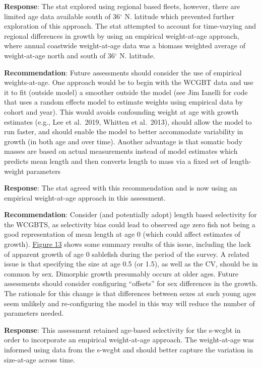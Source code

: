 \documentclass[
  english,
]{article}
\begin{document}
\textbf{Response}: The \gls{stat} explored using regional based fleets,
however, there are limited age data available south of 36\(^\circ\) N.
latitude which prevented further exploration of this approach. The
\gls{stat} attempted to account for time-varying and regional
differences in growth by using an empirical weight-at-age approach,
where annual coastwide weight-at-age data was a biomass weighted average
of weight-at-age north and south of 36\(^\circ\) N. latitude.

\textbf{Recommendation}: Future assessments should consider the use of
empirical weights-at-age. One approach would be to begin with the WCGBT
data and use it to fit (outside model) a smoother outside the model (see
Jim Ianelli for code that uses a random effects model to estimate
weights using empirical data by cohort and year). This would avoids
confounding weight at age with growth estimates (e.g., Lee et al.~2019,
Whitten et al.~2013), should allow the model to run faster, and should
enable the model to better accommodate variability in growth (in both
age and over time). Another advantage is that somatic body masses are
based on actual measurements instead of model estimates which predicts
mean length and then converts length to mass via a fixed set of
length-weight parameters

\textbf{Response}: The \gls{stat} agreed with this recommendation and is
now using an empirical weight-at-age approach in this assessment.

\textbf{Recommendation}: Consider (and potentially adopt) length based
selectivity for the WCGBTS, as selectivity bias could lead to observed
age zero fish not being a good representation of mean length at age 0
(which could affect estimates of growth).
\href{https://www.pcouncil.org/documents/2019/10/sablefish-star-panel-report-july-8-12-2019.pdf/\#page\%20=\%2028}{Figure
13} shows some summary results of this issue, including the lack of
apparent growth of age 0 sablefish during the period of the survey. A
related issue is that specifying the size at age 0.5 (or 1.5), as well
as the CV, should be in common by sex. Dimorphic growth presumably
occurs at older ages. Future assessments should consider configuring
``offsets'' for sex differences in the growth. The rationale for this
change is that differences between sexes at such young ages seem
unlikely and re-configuring the model in this way will reduce the number
of parameters needed.

\textbf{Response}: This assessment retained age-based selectivity for
the \gls{s-wcgbt} in order to incorporate an empirical weight-at-age
approach. The weight-at-age was informed using data from the
\gls{s-wcgbt} and should better capture the variation in size-at-age
across time.
\end{document}
